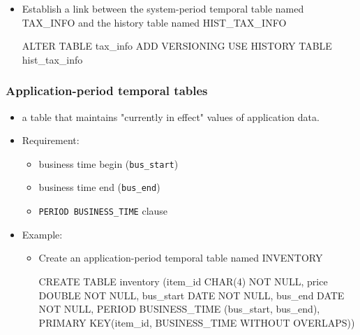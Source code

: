 \documentclass{article}
\begin{document}
\begin{itemize}
\begin{itemize}
    \item Establish a link between the system-period temporal table named TAX\_INFO and the history table
    named HIST\_TAX\_INFO
    \begin{sqlcode}
    	ALTER TABLE tax_info
    	 ADD VERSIONING
    	 USE HISTORY TABLE hist_tax_info
    \end{sqlcode}
%    
\end{itemize}
\end{itemize}

\subsubsection{Application-period temporal tables}
\begin{itemize}
	\item a table that maintains "currently in effect" values of application data.
	\item Requirement:
		\begin{itemize}
			\item business time begin (\texttt{bus\_start})
			\item business time end (\texttt{bus\_end})
			\item \texttt{PERIOD BUSINESS\_TIME} clause
		\end{itemize}
	\item Example:
		\begin{itemize}
			\item Create an application-period temporal table named INVENTORY
			\begin{sqlcode}
			CREATE TABLE inventory
			 (item_id         CHAR(4) NOT NULL,
			  price           DOUBLE NOT NULL,
			  bus_start       DATE NOT NULL,
			  bus_end         DATE NOT NULL,
			 PERIOD BUSINESS_TIME (bus_start, bus_end),
			 PRIMARY KEY(item_id, BUSINESS_TIME WITHOUT OVERLAPS))
			\end{sqlcode}
		\end{itemize}
\end{itemize}
\end{document}
